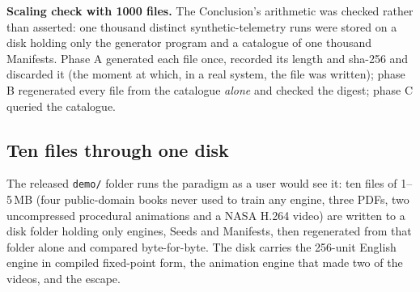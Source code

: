 \documentclass[11pt,a4paper]{article}
\theoremstyle{definition}
\theoremstyle{plain}
\theoremstyle{remark}
\newcommand{\adisk}{AlgorithmicDisk}
\begin{document}
\textbf{Scaling check with 1000 files.} The Conclusion's arithmetic was checked rather than
asserted: one thousand distinct synthetic-telemetry runs were stored on a disk holding only the generator program and a
catalogue of one thousand Manifests. Phase A generated each file once, recorded its length and
sha-256 and discarded it (the moment at which, in a real system, the file was written); phase B
regenerated every file from the catalogue \emph{alone} and checked the digest; phase C queried the
catalogue. \proofSection{}

\subsection{Ten files through one disk}
\label{sec:demo}
The released \texttt{demo/} folder runs the paradigm as a user would see it: ten files of
1--5\,MB (four public-domain books never used to train any engine, three PDFs, two uncompressed
procedural animations and a NASA H.264 video) are written to a disk folder holding only engines,
Seeds and Manifests, then regenerated from that folder alone and compared byte-for-byte. The disk
carries the 256-unit English engine in compiled fixed-point form, the animation engine that made
two of the videos, and the escape.

\begin{table}[!htb]
\centering\small
\caption{Ten files through one \adisk{}. ``engine$/$10'' is the shared engine (201,006\,B:
the int8 English engine plus the animation generator's source) divided by the ten files that share
it; ``Seed $+$ engine$/$10'' is what each file effectively occupies; ``output'' is the size of the
regenerated file, byte-identical to its input in every row. \texttt{xz -6} for comparison.}
\label{tab:demo}
{\scriptsize\setlength{\tabcolsep}{2.4pt}\demoTable{}}
\end{table}
\end{document}

